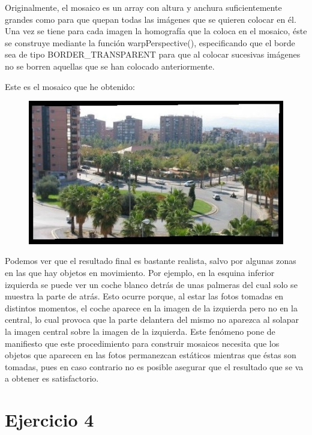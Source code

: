 \documentclass[10pt,a4paper]{article}
\begin{document}
Originalmente, el mosaico es un array con altura y anchura suficientemente grandes como para que quepan todas las imágenes que se quieren colocar en él. Una vez se tiene para cada imagen la homografía que la coloca en el mosaico, éste se construye mediante la función warpPerspective(), especificando que el borde sea de tipo BORDER\_TRANSPARENT para que al colocar sucesivas imágenes no se borren aquellas que se han colocado anteriormente.

Este es el mosaico que he obtenido:

\begin{figure}[h]
	\includegraphics[width=\textwidth]{mosaico3Imgs}
\end{figure}

Podemos ver que el resultado final es bastante realista, salvo por algunas zonas en las que hay objetos en movimiento. Por ejemplo, en la esquina inferior izquierda se puede ver un coche blanco detrás de unas palmeras del cual solo se muestra la parte de atrás. Esto ocurre porque, al estar las fotos tomadas en distintos momentos, el coche aparece en la imagen de la izquierda pero no en la central, lo cual provoca que la parte delantera del mismo no aparezca al solapar la imagen central sobre la imagen de la izquierda. Este fenómeno pone de manifiesto que este procedimiento para construir mosaicos necesita que los objetos que aparecen en las fotos permanezcan estáticos mientras que éstas son tomadas, pues en caso contrario no es posible asegurar que el resultado que se va a obtener es satisfactorio.



\newpage
\section{Ejercicio 4}
\end{document}

